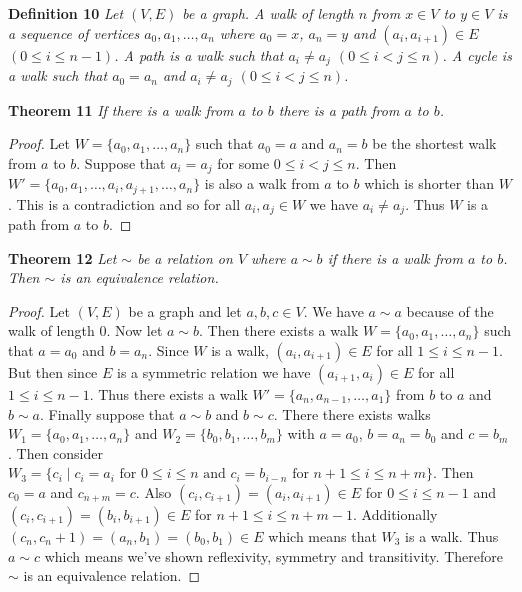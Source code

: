 \documentclass{article}
\begin{document}
\begin{flushleft}
\textbf{Definition 10}
\textsl{Let $(V,E)$ be a graph. A walk of length $n$ from $x \in V$ to $y \in V$ is a sequence of vertices $a_0, a_1, \dots ,a_n$ where $a_0 = x$, $a_n = y$ and $(a_i, a_{i+1}) \in E$ $(0 \leq i \leq n-1)$. A path is a walk such that $a_i \neq a_j$ $(0 \leq i < j \leq n)$. A cycle is a walk such that $a_0 = a_n$ and $a_i \neq a_j$ $(0 \leq i < j \leq n)$.}\newline

\textbf{Theorem 11}
\textsl{If there is a walk from $a$ to $b$ there is a path from $a$ to $b$.}
\begin{proof}
Let $W = \{a_0, a_1, \dots , a_n\}$ such that $a_0 = a$ and $a_n = b$ be the shortest walk from $a$ to $b$. Suppose that $a_i = a_j$ for some $0 \leq i < j \leq n$. Then $W' = \{a_0, a_1, \dots , a_i, a_{j+1}, \dots , a_n\}$ is also a walk from $a$ to $b$ which is shorter than $W$. This is a contradiction and so for all $a_i, a_j \in W$ we have $a_i \neq a_j$. Thus $W$ is a path from $a$ to $b$.
\end{proof}

\textbf{Theorem 12}
\textsl{Let $\sim$ be a relation on $V$ where $a \sim b$ if there is a walk from $a$ to $b$. Then $\sim$ is an equivalence relation.}
\begin{proof}
Let $(V,E)$ be a graph and let $a,b,c \in V$. We have $a \sim a$ because of the walk of length $0$. Now let $a \sim b$. Then there exists a walk $W = \{a_0, a_1, \dots , a_n\}$ such that $a=a_0$ and $b=a_n$. Since $W$ is a walk, $(a_i, a_{i+1}) \in E$ for all $1 \leq i \leq n-1$. But then since $E$ is a symmetric relation we have $(a_{i+1}, a_i) \in E$ for all $1 \leq i \leq n-1$. Thus there exists a walk $W' = \{a_n, a_{n-1}, \dots , a_1\}$ from $b$ to $a$ and $b \sim a$. Finally suppose that $a \sim b$ and $b \sim c$. There there exists walks $W_1 = \{a_0, a_1, \dots , a_n\}$ and $W_2 = \{b_0, b_1, \dots , b_m\}$ with $a = a_0$, $b = a_n = b_0$ and $c = b_m$. Then consider $W_3 = \{c_i \mid \text{$c_i = a_i$ for $0 \leq i \leq n$ and $c_i = b_{i-n}$ for $n+1 \leq i \leq n+m$}\}$. Then $c_0 = a$ and $c_{n+m} = c$. Also $(c_i, c_{i+1}) = (a_i, a_{i+1}) \in E$ for $0 \leq i \leq n-1$ and $(c_i, c_{i+1}) = (b_i, b_{i+1}) \in E$ for $n+1 \leq i \leq n+m-1$. Additionally $(c_n, c_n+1) = (a_n, b_1) = (b_0, b_1) \in E$ which means that $W_3$ is a walk. Thus $a \sim c$ which means we've shown reflexivity, symmetry and transitivity. Therefore $\sim$ is an equivalence relation.
\end{proof}


\end{flushleft}
\end{document}

